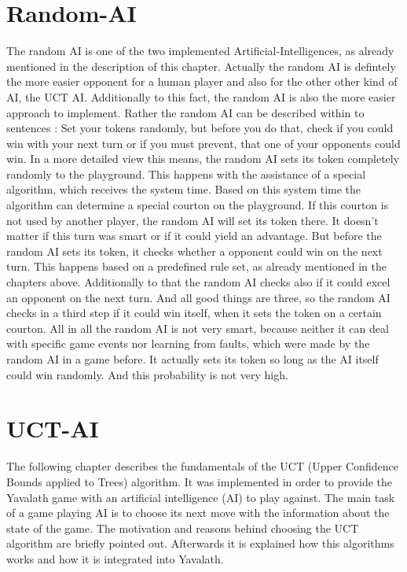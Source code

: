 \documentclass[german]{report}
\begin{document}
\section{Random-AI}
The random AI is one of the two implemented Artificial-Intelligences, as already mentioned in the description of this chapter. 
Actually the random AI is defintely the more easier opponent for a human player and also for the other other kind of AI, the UCT AI. 
Additionally to this fact, the random AI is also the more easier approach to implement. Rather the random AI can be described within to sentences : 
Set your tokens randomly, but before you do that, check if you could  win with your next turn or if you must prevent, that one of your opponents could win. 
In a more detailed view this means, the random AI sets its token completely randomly to the playground. This happens with the assistance of a special algorithm, 
which receives the system time. Based on this system time the algorithm can determine a special courton on the playground. If this courton is not used by 
another player, the random AI will set its token there. It doesn't matter if this turn was smart or if it could yield an advantage. But before the random AI 
sets its token, it checks whether a opponent could win on the next turn. This happens based on a predefined rule set, as already mentioned in the chapters above. 
Additionally to that the random AI checks also if it could excel an opponent on the next turn. And all good things are three, so the random AI checks in a third 
step if it could win itself, when it sets the token on a certain courton. All in all the random AI is not very smart, because neither it can deal with specific 
game events nor learning from faults, which were made by the random AI in a game before. It actually sets its token so long as the AI itself could win randomly. 
And this probability is not very high. 


\section{UCT-AI}
\label{sec:chapter4}
The following chapter describes the fundamentals of the UCT (Upper Confidence
Bounds applied to Trees) algorithm. It was implemented in order to provide the
Yavalath game with an artificial intelligence (AI) to play against. The main
task of a game playing AI is to choose its next move with the information about
the state of the game. The motivation and reasons behind choosing the UCT
algorithm are briefly pointed out. Afterwards it is explained how this
algorithms works and how it is integrated into Yavalath.
\end{document}
